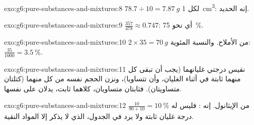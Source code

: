 \begin{solution}{exo:g6:pure-substances-and-mixtures:8}
$78.7 \div 10 = \qty{7.87}{g}$ لكل \qty{1}{cm^3}: إنه الحديد.
\end{solution}

\begin{solution}{exo:g6:pure-substances-and-mixtures:9}
$\frac{357}{478} \approx 0.747$: أي نحو \qty{75}{\percent}.
\end{solution}

\begin{solution}{exo:g6:pure-substances-and-mixtures:10}
$2 \times 35 = \qty{70}{g}$ من الأملاح. والنسبة المئوية: $\frac{35}{1000} =
\qty{3.5}{\percent}$.
\end{solution}

\begin{solution}{exo:g6:pure-substances-and-mixtures:11}
نقيس درجتي غليانهما (يجب أن تبقى كل منهما ثابتة في أثناء الغليان، وأن
تتساويا)، ونزن الحجم نفسه من كل منهما (كتلتان متساويتان). فثابتان
متساويان، كلاهما ثابت، يدلان على 
نفسها.
\end{solution}

\begin{solution}{exo:g6:pure-substances-and-mixtures:12}
$\frac{10}{90 + 10} = \qty{10}{\percent}$ من الإيثانول. إنه : فليس له
درجة غليان ثابتة ولا يرد في الجدول، الذي لا يذكر إلا المواد
النقية.
\end{solution}

